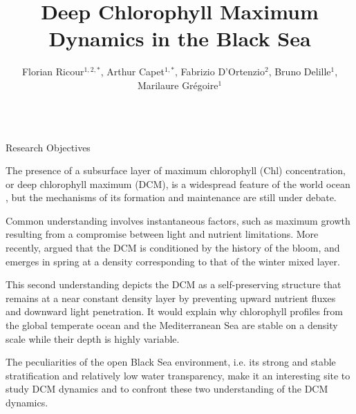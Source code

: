 \documentclass[final]{beamer}
\author[acapet@ulg.ac.be]{
Florian Ricour$^{1,2,*}$,
Arthur Capet$^{1,*}$,
Fabrizio D'Ortenzio$^{2}$,
Bruno Delille$^{1}$,
Marilaure Gr\'{e}goire$^{1}$}
\title[Ricour, F., Capet, A., D’Ortenzio, F., Delille, B. and Grégoire, M., 2021, \textit{Biogeosciences}, 18(2), 755–774. \vspace{2cm} \href{https://bg.copernicus.org/articles/18/755/2021/}{\color{red} \Large \ExternalLink}]
{Deep Chlorophyll Maximum Dynamics in the Black Sea}
\institute{
  $^1$ FOCUS, Liège University, Belgium,
  $^2$ Laboratoire d'Oc\'{e}anographie de Villefranche, Sorbonne Universit\'{e}s, France}
\begin{document}
  \begin{frame}[fragile]\centering
    \begin{columns}[T]

      
      \begin{column}{.33\textwidth}
	\begin{alertblock}{Research Objectives}
	\justify
	
The presence of a subsurface layer of maximum chlorophyll (Chl) concentration, or deep chlorophyll maximum (DCM), is a widespread feature of the world ocean \citep{Cullen2015}, but the mechanisms of its formation and maintenance are still under debate.\\
\vspace{5mm}

Common understanding involves instantaneous factors, such as maximum growth resulting from a compromise between light and nutrient limitations.
More recently, \citet{Navarro2013} argued that the DCM is conditioned by the history of the bloom, and emerges in spring at a density corresponding to that of the winter mixed layer.\\
\vspace{5mm}

This second understanding depicts the DCM as a self-preserving structure that remains at a near constant density layer by preventing upward nutrient fluxes and downward light penetration. It would explain why chlorophyll profiles from the global temperate ocean and the Mediterranean Sea are stable on a density scale while their depth is highly variable.\\
\vspace{5mm}

The peculiarities of the open Black Sea environment, i.e. its strong and stable stratification and relatively low water transparency, make it an interesting site to study DCM dynamics and to confront these two understanding of the DCM dynamics. 
\end{alertblock}
	

\end{column}
\end{columns}
\end{frame}
\end{document}
